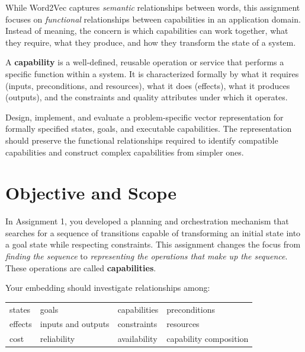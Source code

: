 \documentclass[11pt]{article}
\newcommand{\term}[1]{\textbf{\color{navy}#1}}
\begin{document}
While Word2Vec captures \emph{semantic} relationships between words, this assignment
focuses on \emph{functional} relationships between capabilities in an application domain.
Instead of meaning, the concern is which capabilities can work together, what they require,
what they produce, and how they transform the state of a system.

\begin{keybox}[title={Definition: Capability}]
A \textbf{capability} is a well-defined, reusable operation or service that performs a
specific function within a system. It is characterized formally by what it requires
(inputs, preconditions, and resources), what it does (effects), what it produces (outputs),
and the constraints and quality attributes under which it operates.
\end{keybox}

\begin{keybox}[title={Central task}]
Design, implement, and evaluate a problem-specific vector
representation for formally specified states, goals, and executable capabilities. The
representation should preserve the functional relationships required to identify compatible
capabilities and construct complex capabilities from simpler ones.
\end{keybox}

\clearpage
\section{Objective and Scope}

In Assignment 1, you developed a planning and orchestration mechanism that searches for a
sequence of transitions capable of transforming an initial state into a goal state while
respecting constraints. This assignment changes the focus from \emph{finding the sequence}
to \emph{representing the operations that make up the sequence}. These operations are called
\term{capabilities}.

Your embedding should investigate relationships among:

\begin{center}
\begin{tabularx}{0.94\textwidth}{@{}YYYY@{}}
states & goals & capabilities & preconditions \\
effects & inputs and outputs & constraints & resources \\
cost & reliability & availability & capability composition
\end{tabularx}
\end{center}
\end{document}
